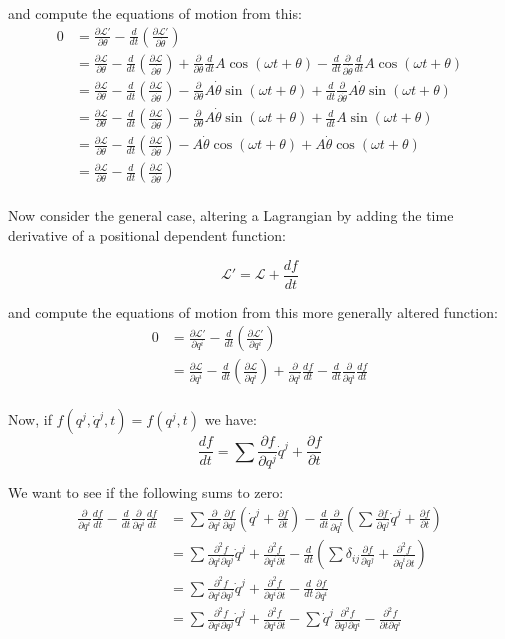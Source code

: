 \documentclass{article}
\newcommand{\LL}[0]{\mathcal{L}}
\newcommand{\dottheta}[0]{\dot{\theta}}
\newcommand{\qdot}[0]{\dot{q}}
\newcommand{\PD}[2]{\frac{\partial {#2}}{\partial {#1}}}
\newcommand{\PDD}[3]{\frac{\partial^2 {#3}}{\partial {#1}\partial {#2}}}
\begin{document}
and compute the equations of motion from this:
\begin{align*}
0 
&= \PD{\theta}{\LL'} - \frac{d}{dt}\left(\PD{\dottheta}{\LL'}\right) \\
&= \PD{\theta}{\LL} - \frac{d}{dt}\left(\PD{\dottheta}{\LL}\right) 
+ \PD{\theta}{} {\frac{d}{dt} A \cos(\omega t + \theta)} 
- \frac{d}{dt} \PD{\dottheta}{} \frac{d}{dt} A \cos(\omega t + \theta) \\
&= \PD{\theta}{\LL} - \frac{d}{dt}\left(\PD{\dottheta}{\LL}\right) 
- \PD{\theta}{} A \dottheta \sin(\omega t + \theta) + 
\frac{d}{dt} \PD{\dottheta}{} A \dottheta \sin(\omega t + \theta) \\
&= \PD{\theta}{\LL} - \frac{d}{dt}\left(\PD{\dottheta}{\LL}\right) 
- \PD{\theta}{} A \dottheta \sin(\omega t + \theta) + \frac{d}{dt} A \sin(\omega t + \theta) \\
&= \PD{\theta}{\LL} - \frac{d}{dt}\left(\PD{\dottheta}{\LL}\right) 
- A \dottheta \cos(\omega t + \theta) + A \dottheta \cos(\omega t + \theta) \\
&= \PD{\theta}{\LL} - \frac{d}{dt}\left(\PD{\dottheta}{\LL}\right)  \\
\end{align*}

Now consider the general case, altering a Lagrangian by adding the time derivative of a positional dependent function:

\begin{equation*}
\LL' = \LL + \frac{df}{dt}
\end{equation*}

and compute the equations of motion from this more generally altered function:
\begin{align*}
0 
&= \PD{q^i}{\LL'} - \frac{d}{dt}\left(\PD{q^i}{\LL'}\right) \\
&= \PD{q^i}{\LL} - \frac{d}{dt}\left(\PD{q^i}{\LL}\right) 
+ \PD{q^i}{}\frac{df}{dt} - \frac{d}{dt} \PD{q^i}{} \frac{df}{dt} \\
\end{align*}

Now, if $f(q^j,\qdot^j,t) = f(q^j,t)$ we have:
\begin{equation*}
\frac{df}{dt} = \sum \PD{q^j}{f} \qdot^j + \PD{t}{f}
\end{equation*}

We want to see if the following sums to zero:
\begin{align*}
\PD{q^i}{}\frac{df}{dt} - \frac{d}{dt} \PD{q^i}{} \frac{df}{dt}
&= \sum \PD{q^i}{} \PD{q^j}{f} \left(\qdot^j + \PD{t}{f}\right) - \frac{d}{dt} \PD{\qdot^i}{} \left(\sum \PD{q^j}{f} \qdot^j + \PD{t}{f}\right) \\
&= \sum \PDD{q^i}{q^j}{f} \qdot^j + \PDD{q^i}{t}{f} - \frac{d}{dt} \left(\sum \delta_{ij} \PD{q^j}{f} + \PDD{\qdot^i}{t}{f}\right) \\
&= \sum \PDD{q^i}{q^j}{f} \qdot^j + \PDD{q^i}{t}{f} - \frac{d}{dt} \PD{q^i}{f} \\
&= \sum \PDD{q^i}{q^j}{f} \qdot^j + \PDD{q^i}{t}{f} - \sum \qdot^j \PDD{q^j}{q^i}{f} - \PDD{t}{q^i}{f} \\
\end{align*}
\end{document}
